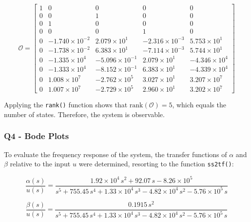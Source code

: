 \begin{equation}
\mathcal{O} =
\begin{bmatrix}
1 & 0 & 0 & 0 & 0 \\
0 & 0 & 1 & 0 & 0 \\
0 & 1 & 0 & 0 & 0 \\
0 & 0 & 0 & 1 & 0 \\
0 & -1.740 \times 10^{-2} & 2.079 \times 10^{1} & -2.316 \times 10^{-3} & 5.753 \times 10^{1} \\
0 & -1.738 \times 10^{-2} & 6.383 \times 10^{1} & -7.114 \times 10^{-3} & 5.744 \times 10^{1} \\
0 & -1.335 \times 10^{4} & -5.096 \times 10^{-1} & 2.079 \times 10^{1} & -4.346 \times 10^{4} \\
0 & -1.333 \times 10^{4} & -8.152 \times 10^{-1} & 6.383 \times 10^{1} & -4.339 \times 10^{4} \\
0 & 1.008 \times 10^{7} & -2.762 \times 10^{5} & 3.027 \times 10^{1} & 3.207 \times 10^{7} \\
0 & 1.007 \times 10^{7} & -2.729 \times 10^{5} & 2.960 \times 10^{1} & 3.202 \times 10^{7}
\end{bmatrix}
\end{equation}

\par Applying the \texttt{rank()} function shows that $\text{rank}(\mathcal{O}) = 5$, which equals the number of states. Therefore, the system is observable.
\vspace{1.5cm}
\subsubsection{Q4 - Bode Plots}
\par To evaluate the frequency response of the system, the transfer functions of $\alpha$ and $\beta$ relative to the input $u$ were determined, resorting to the function \texttt{ss2tf()}:

\begin{equation}
    \frac{\alpha(s)}{u(s)} = \frac{
1.92\times 10^{4}\, s^2 + 92.07\, s - 8.26\times 10^{5}
}{
s^5 + 755.45\, s^4 + 1.33\times 10^{4}\, s^3 - 4.82\times 10^{4}\, s^2 - 5.76\times 10^{5}\, s
}
\end{equation}

\begin{equation}
    \frac{\beta(s)}{u(s)} = \frac{
0.1915\,s^2
}{
s^5 + 755.45\, s^4 + 1.33\times 10^{4}\, s^3 - 4.82\times 10^{4}\, s^2 - 5.76\times 10^{5}\, s
}
\end{equation}

